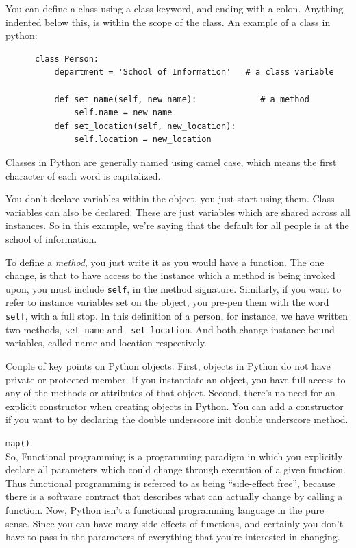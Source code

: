 \documentclass[11pt]{article}
\begin{document}
    \noindent
    You can define a class using a class keyword, and ending with a
    colon.  Anything indented below this, is within the scope of the
    class. An example of a class in python:
    \begin{lstlisting}
      class Person:
          department = 'School of Information'   # a class variable
      
          def set_name(self, new_name):             # a method
              self.name = new_name
          def set_location(self, new_location):
              self.location = new_location
    \end{lstlisting}
    Classes in Python are generally named using camel case, which
    means the first character of each word is capitalized.

    \smallskip\smallskip\noindent
    You don't declare variables within the object, you just start
    using them. Class variables can also be declared. These are just
    variables which are shared across all instances. So in this example,
    we're saying that the default for all people is at the school of
    information.
    
    \smallskip\smallskip\noindent
    To define a {\it method}, you just write it as you would have a
    function. The one change, is that to have access to the instance which
    a method is being invoked upon, you must include {\tt self}, in the
    method signature. Similarly, if you want to refer to instance
    variables set on the object, you pre-pen them with the word {\tt
      self}, with a full stop. In this definition of a person, for instance,
    we have written two methods, {\tt set\_name} and {\tt
      set\_location}. And both change instance bound variables, called name
    and location respectively.
    
    \smallskip\smallskip\noindent
    Couple of key points on Python objects. First, objects in Python
    do not have private or protected member. If you instantiate an object,
    you have full access to any of the methods or attributes of that
    object. Second, there's no need for an explicit constructor when
    creating objects in Python. You can add a constructor if you want to
    by declaring the double underscore init double underscore method.

    \smallskip\smallskip\noindent
    {\tt map()}.\\
    So, Functional programming is a programming paradigm in which you
    explicitly declare all parameters which could change through execution
    of a given function. Thus functional programming is referred to as
    being ``side-effect free'', because there is a software contract that
    describes what can actually change by calling a function. Now, Python
    isn't a functional programming language in the pure sense. Since you
    can have many side effects of functions, and certainly you don't have
    to pass in the parameters of everything that you're interested in
    changing.
    
\end{document}
